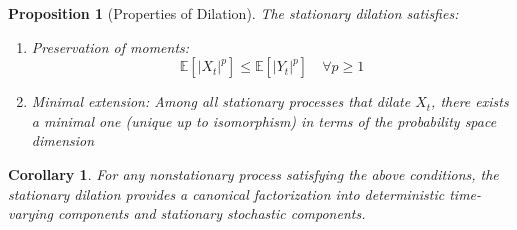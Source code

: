 \documentclass{article}
\newtheorem{corollary}{Corollary}
\newtheorem{proposition}{Proposition}
{\theorembodyfont{\rmfamily}\newtheorem{remark}{Remark}}
\begin{document}
\begin{proposition}[Properties of Dilation]
  The stationary dilation satisfies:
  \begin{enumerate}
    \item Preservation of moments:
    \begin{equation}
      \mathbb{E} [|X_t |^p] \leq \mathbb{E} [|Y_t |^p] \quad \forall p \geq 1
    \end{equation}
    \item Minimal extension: Among all stationary processes that dilate $X_t$,
    there exists a minimal one (unique up to isomorphism) in terms of the
    probability space dimension
  \end{enumerate}
\end{proposition}

\begin{corollary}
  For any nonstationary process satisfying the above conditions, the
  stationary dilation provides a canonical factorization into deterministic
  time-varying components and stationary stochastic components.
\end{corollary}
\end{document}
